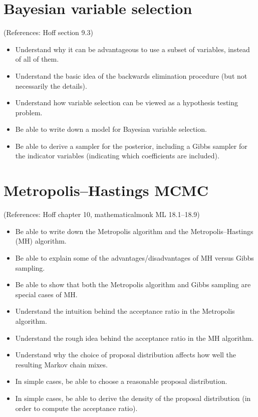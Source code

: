 \documentclass[12pt]{article}
\begin{document}
\section{Bayesian variable selection}
(References: Hoff section 9.3)
\begin{itemize}
\setlength\itemsep{0em}
\item Understand why it can be advantageous to use a subset of variables, instead of all of them.
\item Understand the basic idea of the backwards elimination procedure (but not necessarily the details).
\item Understand how variable selection can be viewed as a hypothesis testing problem.
\item Be able to write down a model for Bayesian variable selection.
\item Be able to derive a sampler for the posterior, including a Gibbs sampler for the indicator variables (indicating which coefficients are included).
\end{itemize}




\section{Metropolis--Hastings MCMC}
(References: Hoff chapter 10, mathematicalmonk ML 18.1--18.9)
\begin{itemize}
\setlength\itemsep{0em}
\item Be able to write down the Metropolis algorithm and the Metropolis--Hastings (MH) algorithm.
\item Be able to explain some of the advantages/disadvantages of MH versus Gibbs sampling.
\item Be able to show that both the Metropolis algorithm and Gibbs sampling are special cases of MH.
\item Understand the intuition behind the acceptance ratio in the Metropolis algorithm. 
\item Understand the rough idea behind the acceptance ratio in the MH algorithm. 
\item Understand why the choice of proposal distribution affects how well the resulting Markov chain mixes.
\item In simple cases, be able to choose a reasonable proposal distribution.
\item In simple cases, be able to derive the density of the proposal distribution (in order to compute the acceptance ratio).
\end{itemize}
\end{document}

